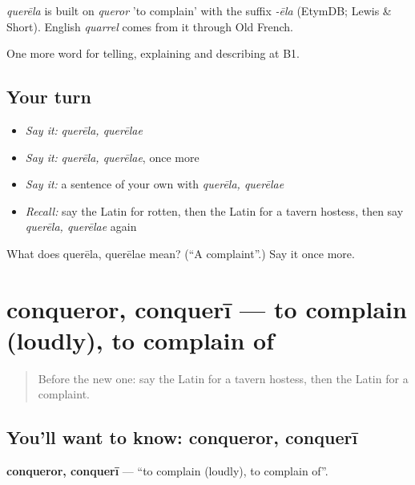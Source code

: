 \begin{cousinweb}
\emph{querēla} is built on \emph{queror} 'to complain' with the suffix \emph{-ēla} (EtymDB; Lewis \& Short). English \emph{quarrel} comes from it through Old French.
\end{cousinweb}

\begin{grammarlens}[title={What you've built}]
One more word for telling, explaining and describing at B1.
\end{grammarlens}

\subsection*{Your turn}
\begin{itemize}
\raggedright
  \item \emph{Say it:} \emph{querēla, querēlae}
  \item \emph{Say it:} \emph{querēla, querēlae}, once more
  \item \emph{Say it:} a sentence of your own with \emph{querēla, querēlae}
  \item \emph{Recall:} say the Latin for rotten, then the Latin for a tavern hostess, then say \emph{querēla, querēlae} again
\end{itemize}

\begin{tcolorbox}[breakable,colback=teal!4,colframe=teal!35!black,title={Before you move on}]
What does querēla, querēlae mean? (\textquotedblleft{}A complaint\textquotedblright{}.) Say it once more.
\end{tcolorbox}
\section[conqueror, conquerī]{conqueror, conquerī — to complain (loudly), to complain of}

\label{lesson:LA-C450-conqueror}



\begin{quote}
Before the new one: say the Latin for a tavern hostess, then the Latin for a complaint.
\end{quote}

\subsection*{You'll want to know: conqueror, conquerī}
\textbf{conqueror, conquerī} — \textquotedblleft{}to complain (loudly), to complain of\textquotedblright{}.

